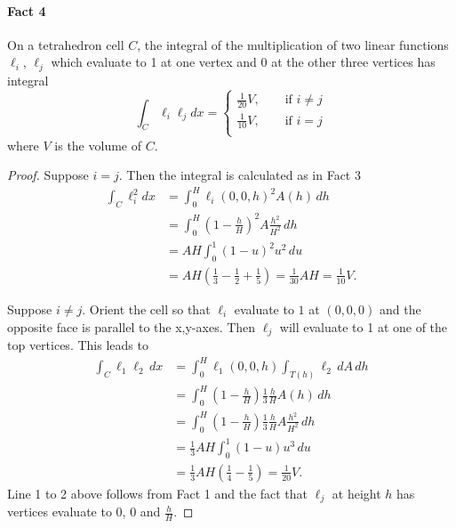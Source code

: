 \documentclass[12pt,letterpaper]{article}
\begin{document}
\paragraph{Fact 4}
On a tetrahedron cell $C$, the integral of the multiplication of two linear functions $\ell_i$, $\ell_j$ which evaluate to 1 at one vertex and 0 at the other three vertices has integral
\begin{equation}
\int_C \ell_i \ell_j dx = \begin{cases}
\frac{1}{20} V, \qquad \textrm{if } i \neq j \\
\frac{1}{10} V, \qquad \textrm{if } i = j \\
\end{cases}
\end{equation}
where $V$ is the volume of $C$.
\begin{proof}
Suppose $i = j$.
Then the integral is calculated as in Fact 3
\begin{align*}
\int_C \ell_i^2 dx &= \int_0^H \ell_i(0,0,h)^2 A(h) \, dh \\
&= \int_0^H \left(1 - \frac{h}{H} \right)^2 A \frac{h^2}{H^2} \, dh \\
&= A H \int_0^1 (1 - u)^2 u^2 \, du \\
&= A H \left(\frac{1}{3} - \frac{1}{2} + \frac{1}{5}\right) = \frac{1}{30} A H = \frac{1}{10} V.
\end{align*}

Suppose $i \neq j$.
Orient the cell so that $\ell_i$ evaluate to $1$ at $(0,0,0)$ and the opposite face is parallel to the x,y-axes.
Then $\ell_j$ will evaluate to 1 at one of the top vertices.
This leads to
\begin{align*}
\int_C \ell_1 \ell_2 \, dx &= \int_0^H \ell_1(0,0,h) \int_{T(h)} \ell_2 \, dA \, dh \\
&= \int_0^H \left(1 - \frac{h}{H}\right) \frac{1}{3} \frac{h}{H} A(h) \, dh \\
&= \int_0^H \left(1 - \frac{h}{H}\right) \frac{1}{3} \frac{h}{H} A \frac{h^2}{H^2} \, dh \\
&= \frac{1}{3} A H \int_0^1 (1 - u) u^3 \, du \\
&= \frac{1}{3} A H \left(\frac{1}{4} - \frac{1}{5}\right) = \frac{1}{20} V.
\end{align*}
Line 1 to 2 above follows from Fact 1 and the fact that $\ell_j$ at height $h$ has vertices evaluate to $0$, $0$ and $\frac{h}{H}$.
\end{proof}
\end{document}
